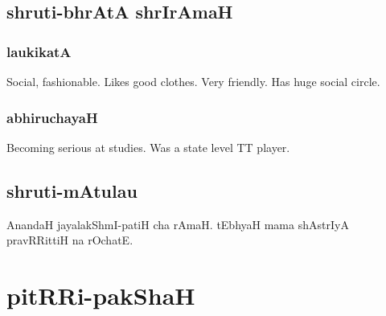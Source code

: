 \documentclass[oneside, article]{memoir}
\begin{document}
\chapter{shruti-bhrAtA shrIrAmaH}
\section{laukikatA}
Social, fashionable. Likes good clothes. Very friendly. Has huge social circle.

\section{abhiruchayaH}
Becoming serious at studies. Was a state level TT player.

\chapter{shruti-mAtulau}
AnandaH jayalakShmI-patiH cha rAmaH. tEbhyaH mama shAstrIyA pravRRittiH na rOchatE.

\part{pitRRi-pakShaH}
\end{document}
